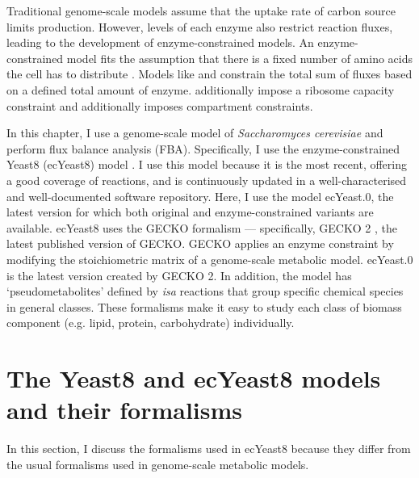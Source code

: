 Traditional genome-scale models assume that the uptake rate of carbon source limits production.
However, levels of each enzyme also restrict reaction fluxes, leading to the development of enzyme-constrained models.
An enzyme-constrained model fits the assumption that there is a fixed number of amino acids the cell has to distribute \parencite{weisseMechanisticLinksCellular2015}.
Models like \textcite{sanchezImprovingPhenotypePredictions2017} and \textcite{elsemmanWholecellModelingYeast2022} constrain the total sum of fluxes based on a defined total amount of enzyme.
\textcite{elsemmanWholecellModelingYeast2022} additionally impose a ribosome capacity constraint and additionally imposes compartment constraints.

In this chapter, I use a genome-scale model of \textit{Saccharomyces cerevisiae} and perform flux balance analysis (FBA).
Specifically, I use the enzyme-constrained Yeast8 (ecYeast8) model \parencite{luConsensusCerevisiaeMetabolic2019}.
I use this model because it is the most recent, offering a good coverage of reactions, and is continuously updated in a well-characterised and well-documented software repository.
Here, I use the model ec\-Yeast.0, the latest version for which both original and enzyme-constrained variants are available.
ecYeast8 uses the GECKO formalism \parencite{sanchezImprovingPhenotypePredictions2017} --- specifically, GECKO 2 \parencite{domenzainReconstructionCatalogueGenomescale2022}, the latest published version of GECKO.
GECKO applies an enzyme constraint by modifying the stoichiometric matrix of a genome-scale metabolic model.
ec\-Yeast.0 is the latest version created by GECKO 2.
In addition, the model has `pseudometabolites' defined by \textit{isa} reactions \parencite{heavnerYeastExpandedReconstruction2012} that group specific chemical species in general classes.
These formalisms make it easy to study each class of biomass component (e.g. lipid, protein, carbohydrate) individually.

\section{The Yeast8 and ecYeast8 models and their formalisms}
\label{sec:model-yeast8}

In this section, I discuss the formalisms used in ecYeast8 because they differ from the usual formalisms used in genome-scale metabolic models.

